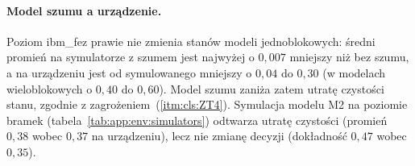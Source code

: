 \paragraph{Model szumu a urządzenie.}
Poziom ibm\_fez prawie nie zmienia stanów modeli jednoblokowych: średni promień na symulatorze z szumem jest najwyżej o $0{,}007$ mniejszy niż bez szumu, a na urządzeniu jest od symulowanego mniejszy o $0{,}04$ do $0{,}30$ (w modelach wieloblokowych o $0{,}40$ do $0{,}60$).
Model szumu zaniża zatem utratę czystości stanu, zgodnie z zagrożeniem~(\ref{itm:cls:ZT4}).
Symulacja modelu M2 na poziomie bramek (tabela~\ref{tab:app:env:simulators}) odtwarza utratę czystości (promień $0{,}38$ wobec $0{,}37$ na urządzeniu), lecz nie zmianę decyzji (dokładność $0{,}47$ wobec $0{,}35$).

